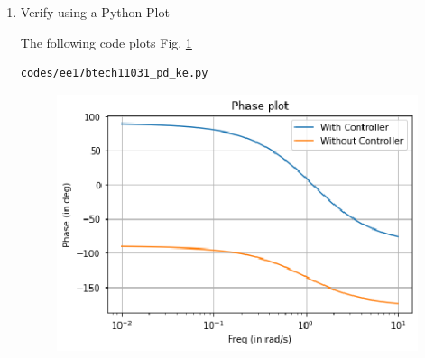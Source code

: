 \begin{enumerate}[label=\thesection.\arabic*.,ref=\thesection.\theenumi]
\begin{table}[!ht]
    \centering
    
    \caption{}
    \label{table:ee17btech11031_final}
\end{table}

\item
Verify using a Python Plot

\solution The following code plots Fig. \ref{fig:ee17btech11031_pd_ke}

\begin{lstlisting}
codes/ee17btech11031_pd_ke.py
\end{lstlisting}

\begin{figure}[!ht]
\centering
\includegraphics[width=\columnwidth]{./figs/ee17btech11031_pd_ke.eps}
\caption{}
\label{fig:ee17btech11031_pd_ke}
\end{figure}
\end{enumerate}
